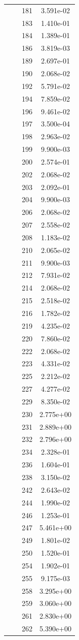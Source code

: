 \documentclass[12pt]{article}
\begin{document}
\begin{longtable}{@{}cccc@{}}
 &  & 181 & 3.591e-02 \\
 &  & 183 & 1.410e-01 \\
 &  & 184 & 1.389e-01 \\
 &  & 186 & 3.819e-03 \\
 &  & 189 & 2.697e-01 \\
 &  & 190 & 2.068e-02 \\
 &  & 192 & 5.791e-02 \\
 &  & 194 & 7.859e-02 \\
 &  & 196 & 9.461e-02 \\
 &  & 197 & 3.500e-04 \\
 &  & 198 & 2.963e-02 \\
 &  & 199 & 9.900e-03 \\
 &  & 200 & 2.574e-01 \\
 &  & 202 & 2.068e-02 \\
 &  & 203 & 2.092e-01 \\
 &  & 204 & 9.900e-03 \\
 &  & 206 & 2.068e-02 \\
 &  & 207 & 2.558e-02 \\
 &  & 208 & 1.183e-02 \\
 &  & 210 & 2.065e-02 \\
 &  & 211 & 9.900e-03 \\
 &  & 212 & 7.931e-02 \\
 &  & 214 & 2.068e-02 \\
 &  & 215 & 2.518e-02 \\
 &  & 216 & 1.782e-02 \\
 &  & 219 & 4.235e-02 \\
 &  & 220 & 7.860e-02 \\
 &  & 222 & 2.068e-02 \\
 &  & 223 & 4.331e-02 \\
 &  & 225 & 2.212e-02 \\
 &  & 227 & 4.277e-02 \\
 &  & 229 & 8.350e-02 \\
 &  & 230 & 2.775e+00 \\
 &  & 231 & 2.889e+00 \\
 &  & 232 & 2.796e+00 \\
 &  & 234 & 2.328e-01 \\
 &  & 236 & 1.604e-01 \\
 &  & 238 & 3.150e-02 \\
 &  & 242 & 2.643e-02 \\
 &  & 244 & 1.990e-02 \\
 &  & 246 & 1.253e-01 \\
 &  & 247 & 5.461e+00 \\
 &  & 249 & 1.801e-02 \\
 &  & 250 & 1.520e-01 \\
 &  & 254 & 1.902e-01 \\
 &  & 255 & 9.175e-03 \\
 &  & 258 & 3.295e+00 \\
 &  & 259 & 3.060e+00 \\
 &  & 261 & 2.830e+00 \\
 &  & 262 & 5.390e+00 \\


\end{longtable}
\end{document}
